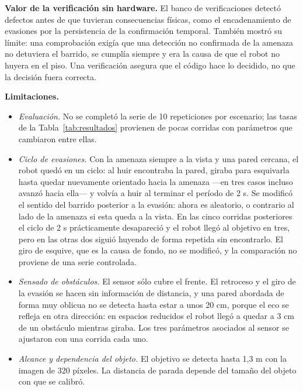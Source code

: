 \documentclass[pdflatex,sn-mathphys-num]{sn-jnl}
\begin{document}
\textbf{Valor de la verificaci\'on sin hardware.} El banco de verificaciones
detect\'o defectos antes de que tuvieran consecuencias f\'isicas, como el
encadenamiento de evasiones por la persistencia de la confirmaci\'on
temporal. Tambi\'en mostr\'o su l\'imite: una comprobaci\'on exig\'ia que una
detecci\'on no confirmada de la amenaza no detuviera el barrido, se cumpl\'ia
siempre y era la causa de que el robot no huyera en el piso. Una
verificaci\'on asegura que el c\'odigo hace lo decidido, no que la decisi\'on
fuera correcta.

\textbf{Limitaciones.}
\begin{itemize}
  \item \emph{Evaluaci\'on.} No se complet\'o la serie de 10 repeticiones por
        escenario; las tasas de la Tabla~\ref{tab:resultados} provienen de
        pocas corridas con par\'ametros que cambiaron entre ellas.
  \item \emph{Ciclo de evasiones.} Con la amenaza siempre a la vista y una
        pared cercana, el robot qued\'o en un ciclo: al huir encontraba la
        pared, giraba para esquivarla hasta quedar nuevamente orientado
        hacia la amenaza ---en tres casos incluso avanz\'o hacia ella--- y
        volv\'ia a huir al terminar el per\'iodo de 2 s. Se modific\'o el
        sentido del barrido posterior a la evasi\'on: ahora es aleatorio, o
        contrario al lado de la amenaza si esta queda a la vista. En las
        cinco corridas posteriores el ciclo de 2 s pr\'acticamente
        desapareci\'o y el robot lleg\'o al objetivo en tres, pero en las
        otras dos sigui\'o huyendo de forma repetida sin encontrarlo. El giro
        de esquive, que es la causa de fondo, no se modific\'o, y la
        comparaci\'on no proviene de una serie controlada.
  \item \emph{Sensado de obst\'aculos.} El sensor s\'olo cubre el frente. El
        retroceso y el giro de la evasi\'on se hacen sin informaci\'on de
        distancia, y una pared abordada de forma muy oblicua no se detecta
        hasta estar a unos 20 cm, porque el eco se refleja en otra
        direcci\'on: en espacios reducidos el robot lleg\'o a quedar a 3 cm
        de un obst\'aculo mientras giraba. Los tres par\'ametros asociados al
        sensor se ajustaron con una corrida cada uno.
  \item \emph{Alcance y dependencia del objeto.} El objetivo se detecta
        hasta 1,3 m con la imagen de 320 p\'ixeles. La distancia de parada
        depende del tama\~no del objeto con que se calibr\'o.

\end{itemize}
\end{document}
